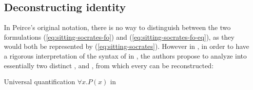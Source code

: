 \begin{scope}
\begin{scope}
\subsection{Deconstructing identity}

In Peirce's original notation, there is no way to distinguish between the two
formulations (\ref{eq:sitting-socrates-fo}) and
(\ref{eq:sitting-socrates-fo-eq}), as they would both be represented by
 (\ref{eq:sitting-socrates}). However in
, in order to have a rigorous
interpretation of the syntax of  in , the authors
propose to analyze  into essentially two distinct ,
\emph{} and \emph{}, from which every  can be reconstructed:

\begin{marginfigure}
  
  \caption{Universal quantification $\forall x. P(x)$ in }
\end{marginfigure}


\end{scope}
\end{scope}
